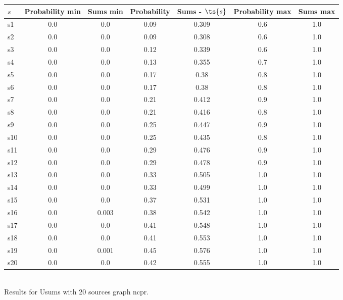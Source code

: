 \documentclass{article}
\begin{document}
\noindent\begin{tabular}{|l|c|c|c|c|c|c|}
\hline
$s$& Probability min & Sums min & Probability & Sums - $\ts{s}$ & Probability max & Sums max\\
\hline
s1 &0.0 & 0.0 & 0.09 & 0.309 & 0.6 & 1.0\\
\hline
s2 &0.0 & 0.0 & 0.09 & 0.308 & 0.6 & 1.0\\
\hline
s3 &0.0 & 0.0 & 0.12 & 0.339 & 0.6 & 1.0\\
\hline
s4 &0.0 & 0.0 & 0.13 & 0.355 & 0.7 & 1.0\\
\hline
s5 &0.0 & 0.0 & 0.17 & 0.38 & 0.8 & 1.0\\
\hline
s6 &0.0 & 0.0 & 0.17 & 0.38 & 0.8 & 1.0\\
\hline
s7 &0.0 & 0.0 & 0.21 & 0.412 & 0.9 & 1.0\\
\hline
s8 &0.0 & 0.0 & 0.21 & 0.416 & 0.8 & 1.0\\
\hline
s9 &0.0 & 0.0 & 0.25 & 0.447 & 0.9 & 1.0\\
\hline
s10 &0.0 & 0.0 & 0.25 & 0.435 & 0.8 & 1.0\\
\hline
s11 &0.0 & 0.0 & 0.29 & 0.476 & 0.9 & 1.0\\
\hline
s12 &0.0 & 0.0 & 0.29 & 0.478 & 0.9 & 1.0\\
\hline
s13 &0.0 & 0.0 & 0.33 & 0.505 & 1.0 & 1.0\\
\hline
s14 &0.0 & 0.0 & 0.33 & 0.499 & 1.0 & 1.0\\
\hline
s15 &0.0 & 0.0 & 0.37 & 0.531 & 1.0 & 1.0\\
\hline
s16 &0.0 & 0.003 & 0.38 & 0.542 & 1.0 & 1.0\\
\hline
s17 &0.0 & 0.0 & 0.41 & 0.548 & 1.0 & 1.0\\
\hline
s18 &0.0 & 0.0 & 0.41 & 0.553 & 1.0 & 1.0\\
\hline
s19 &0.0 & 0.001 & 0.45 & 0.576 & 1.0 & 1.0\\
\hline
s20 &0.0 & 0.0 & 0.42 & 0.555 & 1.0 & 1.0\\
\hline
\end{tabular}\\

\noindent Results for Usums with 20 sources graph ncpr.
\end{document}
